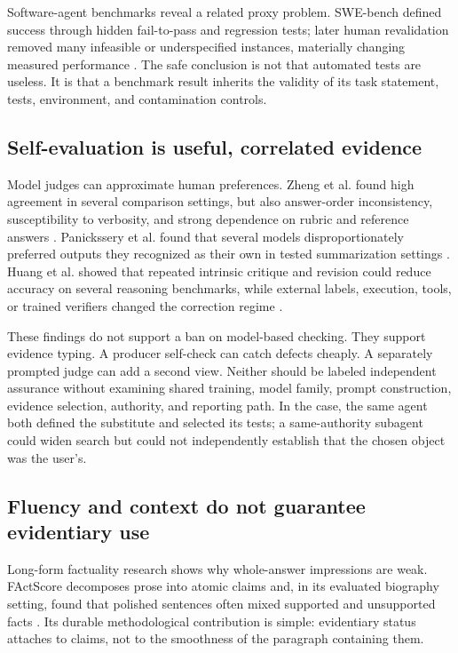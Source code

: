 \documentclass[10pt,a4paper]{article}
\begin{document}
Software-agent benchmarks reveal a related proxy problem. SWE-bench defined success through hidden fail-to-pass and regression tests; later human revalidation removed many infeasible or underspecified instances, materially changing measured performance \cite{swebench,sweverified}. The safe conclusion is not that automated tests are useless. It is that a benchmark result inherits the validity of its task statement, tests, environment, and contamination controls.

\subsection{Self-evaluation is useful, correlated evidence}

Model judges can approximate human preferences. Zheng et al. found high agreement in several comparison settings, but also answer-order inconsistency, susceptibility to verbosity, and strong dependence on rubric and reference answers \cite{zheng2023}. Panickssery et al. found that several models disproportionately preferred outputs they recognized as their own in tested summarization settings \cite{panickssery2024}. Huang et al. showed that repeated intrinsic critique and revision could reduce accuracy on several reasoning benchmarks, while external labels, execution, tools, or trained verifiers changed the correction regime \cite{huang2024}.

These findings do not support a ban on model-based checking. They support evidence typing. A producer self-check can catch defects cheaply. A separately prompted judge can add a second view. Neither should be labeled independent assurance without examining shared training, model family, prompt construction, evidence selection, authority, and reporting path. In the case, the same agent both defined the substitute and selected its tests; a same-authority subagent could widen search but could not independently establish that the chosen object was the user's.

\subsection{Fluency and context do not guarantee evidentiary use}

Long-form factuality research shows why whole-answer impressions are weak. FActScore decomposes prose into atomic claims and, in its evaluated biography setting, found that polished sentences often mixed supported and unsupported facts \cite{factscore}. Its durable methodological contribution is simple: evidentiary status attaches to claims, not to the smoothness of the paragraph containing them.
\end{document}
